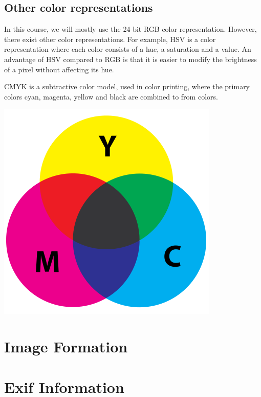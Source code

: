 \documentclass{book}
\begin{document}
\subsection{Other color representations}
In this course, we will mostly use the 24-bit RGB color representation. However, there exist other color representations. For example, HSV is a color representation where each color consists of a hue, a saturation and a value. An advantage of HSV compared to RGB is that it is easier to modify the brightness of a pixel without affecting its hue.

CMYK is a subtractive color model, used in color printing, where the primary colors cyan, magenta, yellow and black are combined to from colors.
\begin{center}
\includegraphics[scale=0.15]{cmyk.png}
\end{center}

\section{Image Formation}


\section{Exif Information}
\end{document}
